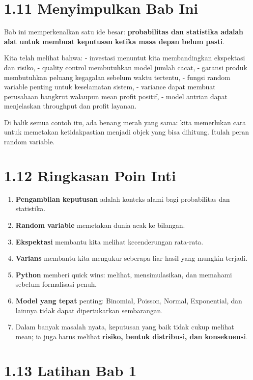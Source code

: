 \documentclass[
  letterpaper,
  DIV=11,
  numbers=noendperiod]{scrreprt}
\providecommand{\tightlist}{%
  \setlength{\itemsep}{0pt}\setlength{\parskip}{0pt}}
\begin{document}
\section{1.11 Menyimpulkan Bab Ini}\label{menyimpulkan-bab-ini}

Bab ini memperkenalkan satu ide besar: \textbf{probabilitas dan
statistika adalah alat untuk membuat keputusan ketika masa depan belum
pasti}.

Kita telah melihat bahwa: - investasi menuntut kita membandingkan
ekspektasi dan risiko, - quality control membutuhkan model jumlah cacat,
- garansi produk membutuhkan peluang kegagalan sebelum waktu tertentu, -
fungsi random variable penting untuk keselamatan sistem, - variance
dapat membuat perusahaan bangkrut walaupun mean profit positif, - model
antrian dapat menjelaskan throughput dan profit layanan.

Di balik semua contoh itu, ada benang merah yang sama: kita memerlukan
cara untuk memetakan ketidakpastian menjadi objek yang bisa dihitung.
Itulah peran random variable.

\section{1.12 Ringkasan Poin Inti}\label{ringkasan-poin-inti}

\begin{enumerate}
\def\labelenumi{\arabic{enumi}.}
\tightlist
\item
  \textbf{Pengambilan keputusan} adalah konteks alami bagi probabilitas
  dan statistika.
\item
  \textbf{Random variable} memetakan dunia acak ke bilangan.
\item
  \textbf{Ekspektasi} membantu kita melihat kecenderungan rata-rata.
\item
  \textbf{Varians} membantu kita mengukur seberapa liar hasil yang
  mungkin terjadi.
\item
  \textbf{Python} memberi quick wins: melihat, mensimulasikan, dan
  memahami sebelum formalisasi penuh.
\item
  \textbf{Model yang tepat} penting: Binomial, Poisson, Normal,
  Exponential, dan lainnya tidak dapat dipertukarkan sembarangan.
\item
  Dalam banyak masalah nyata, keputusan yang baik tidak cukup melihat
  mean; ia juga harus melihat \textbf{risiko, bentuk distribusi, dan
  konsekuensi}.
\end{enumerate}

\section{1.13 Latihan Bab 1}\label{latihan-bab-1}
\end{document}
